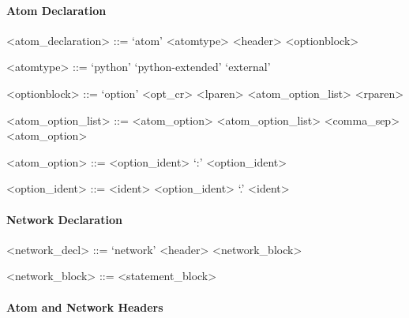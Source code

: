 \paragraph{Atom Declaration}

\begin{grammar}
  <atom_declaration> ::= `atom' <atomtype> <header> <optionblock>

  <atomtype> ::= `python'
  \alt `python-extended'
  \alt `external'

  <optionblock> ::= `option' <opt_cr> <lparen> <atom_option_list> <rparen>

  <atom_option_list> ::= <atom_option>
  \alt <atom_option_list> <comma_sep> <atom_option>

  <atom_option> ::= <option_ident> `:' <option_ident>

  <option_ident> ::= <ident>
  \alt <option_ident> `.' <ident>
\end{grammar}


\paragraph{Network Declaration}

\begin{grammar}
  <network_decl> ::= `network' <header> <network_block>

  <network_block> ::= <statement_block>
\end{grammar}


\paragraph{Atom and Network Headers}

